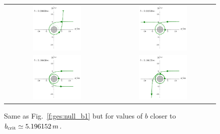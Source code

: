 \begin{figure}
\begin{tabular}{cc}
\includegraphics[width=0.48\textwidth]{ges_null_b_5_230000.pdf} &
\includegraphics[width=0.48\textwidth]{ges_null_b_5_202500.pdf} \\
\includegraphics[width=0.48\textwidth]{ges_null_b_5_196430.pdf} &
\includegraphics[width=0.48\textwidth]{ges_null_b_5_196155.pdf}
\end{tabular}
\caption[]{\label{f:ges:null_b2} \footnotesize
Same as Fig.~\ref{f:ges:null_b1} but for values of $b$ closer to
$b_{\rm crit} \simeq 5.196152\, m$.}
\end{figure}

